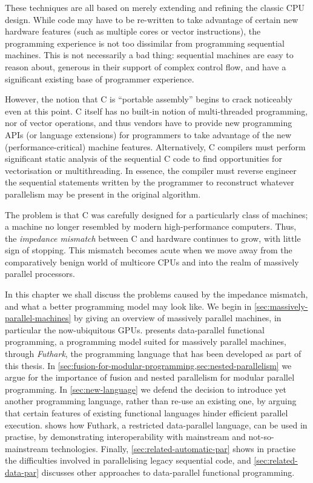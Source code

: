 These techniques are all based on merely extending and refining the
classic CPU design.  While code may have to be re-written to take
advantage of certain new hardware features (such as multiple cores or
vector instructions), the programming experience is not too dissimilar
from programming sequential machines.  This is not necessarily a bad
thing: sequential machines are easy to reason about, generous in their
support of complex control flow, and have a significant existing base
of programmer experience.

However, the notion that C is ``portable assembly'' begins to crack
noticeably even at this point.  C itself has no built-in notion of
multi-threaded programming, nor of vector operations, and thus vendors
have to provide new programming APIs (or language extensions) for
programmers to take advantage of the new (performance-critical)
machine features.  Alternatively, C compilers must perform significant
static analysis of the sequential C code to find opportunities for
vectorisation or multithreading.  In essence, the compiler must
reverse engineer the sequential statements written by the programmer
to reconstruct whatever parallelism may be present in the original
algorithm.

The problem is that C was carefully designed for a particularly class
of machines; a machine no longer resembled by modern high-performance
computers.  Thus, the \textit{impedance mismatch} between C and
hardware continues to grow, with little sign of stopping.  This
mismatch becomes acute when we move away from the comparatively benign
world of multicore CPUs and into the realm of massively parallel
processors.

In this chapter we shall discuss the problems caused by the impedance
mismatch, and what a better programming model may look like.  We begin
in \cref{sec:massively-parallel-machines} by giving an overview of
massively parallel machines, in particular the now-ubiquitous GPUs.
 presents data-parallel
functional programming, a programming model suited for massively
parallel machines, through \textit{Futhark}, the programming language
that has been developed as part of this thesis.  In
\cref{sec:fusion-for-modular-programming,sec:nested-parallelism} we
argue for the importance of fusion and nested parallelism for modular
parallel programming.  In \cref{sec:new-language} we defend the
decision to introduce yet another programming language, rather than
re-use an existing one, by arguing that certain features of existing
functional languages hinder efficient parallel execution.
 shows how Futhark, a restricted
data-parallel language, can be used in practise, by demonstrating
interoperability with mainstream and not-so-mainstream technologies.
Finally, \cref{sec:related-automatic-par} shows in practise the
difficulties involved in parallelising legacy sequential code, and
\cref{sec:related-data-par} discusses other approaches to
data-parallel functional programming.

